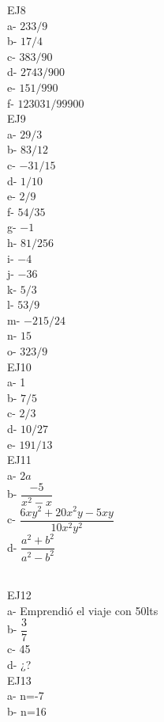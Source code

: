 \documentclass[12pt,a4paper]{article}
\begin{document}
%
%
%
EJ8\\
a- $233/9$\\
b- $17/4$\\
c- $383/90$\\
d- $2743/900$\\
e- $151/990$\\
f- $123031/99900$\\
EJ9\\
a- $29/3$\\
b- $83/12$\\
c- $ -31/15$\\
d- $1/10$\\
e- $2/9$\\
f- $54/35$\\
g- $-1$\\
h- $ 81/256$\\
i- $-4 $\\
j- $ -36$\\
k- $5/3$\\
l- $53/9$\\
m- $-215/24$\\
n- $15$\\
o- $323/9$\\
EJ10\\
a- 1\\
b- $7/5$\\
c- $2/3$\\
d- $10/27$\\
e- $191/13$\\

EJ11\\
a- $2a$\\
b- $\dfrac{-5}{x^{2}-x} $\\
c- $\dfrac{6xy^{2}+20x^{2}y-5xy}{10x^{2}y^{2}} $\\
d- $\dfrac{a^{2}+b^{2}}{a^{2}-b^{2}} $\\\

EJ12\\
a- Emprendió el viaje con 50lts\\
b- $\dfrac{3}{7}$\\
c- 45\\
d- ¿?\\
EJ13\\
a- n=-7\\
b- n=16\\
\end{document}
